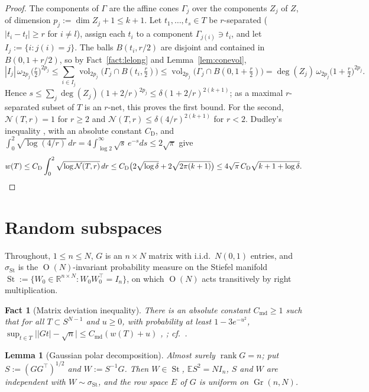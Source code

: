 \documentclass[11pt]{article}
\newtheorem{lemma}[theorem]{Lemma}
\newtheorem{fact}[theorem]{Fact}
\newcommand{\R}{\mathbb{R}}
\newcommand{\E}{\mathbb{E}}
\newcommand{\cN}{\mathcal{N}}
\DeclareMathOperator{\vol}{vol}
\DeclareMathOperator{\rank}{rank}
\DeclareMathOperator{\Gr}{Gr}
\DeclareMathOperator{\St}{St}
\DeclareMathOperator{\Ort}{O}
\newcommand{\Cmd}{C_{\mathrm{md}}}
\newcommand{\CD}{C_{\mathrm{D}}}
\begin{document}
\begin{proof}
The components of $\Gamma$ are the affine cones $\Gamma_j$ over the components $Z_j$ of $Z$, of dimension $p_j:=\dim Z_j+1\le k+1$. Let $t_1,\dots,t_s\in T$ be $r$-separated ($|t_i-t_l|\ge r$ for $i\ne l$), assign each $t_i$ to a component $\Gamma_{j(i)}\ni t_i$, and let $I_j:=\{i:j(i)=j\}$. The balls $B(t_i,r/2)$ are disjoint and contained in $B(0,1+r/2)$, so by Fact~\ref{fact:lelong} and Lemma~\ref{lem:conevol},
\[
|I_j|\,\omega_{2p_j}\big(\tfrac r2\big)^{2p_j}\le\sum_{i\in I_j}\vol_{2p_j}\big(\Gamma_j\cap B(t_i,\tfrac r2)\big)\le\vol_{2p_j}\big(\Gamma_j\cap B(0,1+\tfrac r2)\big)=\deg(Z_j)\,\omega_{2p_j}\big(1+\tfrac r2\big)^{2p_j}.
\]
Hence $s\le\sum_j\deg(Z_j)(1+2/r)^{2p_j}\le\delta(1+2/r)^{2(k+1)}$; as a maximal $r$-separated subset of $T$ is an $r$-net, this proves the first bound. For the second, $\cN(T,r)=1$ for $r\ge2$ and $\cN(T,r)\le\delta(4/r)^{2(k+1)}$ for $r<2$. Dudley's inequality \cite[Thm.~8.1.3]{Vershynin}, with an absolute constant $\CD$, and $\int_0^2\sqrt{\log(4/r)}\,dr=4\int_{\log2}^\infty\sqrt s\,e^{-s}ds\le2\sqrt\pi$ give
\[
w(T)\le\CD\int_0^2\sqrt{\log\cN(T,r)}\,dr\le\CD\big(2\sqrt{\log\delta}+2\sqrt{2\pi(k+1)}\big)\le4\sqrt\pi\,\CD\sqrt{k+1+\log\delta}.\qedhere
\]
\end{proof}

\section{Random subspaces}

Throughout, $1\le n\le N$, $G$ is an $n\times N$ matrix with i.i.d.\ $N(0,1)$ entries, and $\sigma_{\St}$ is the $\Ort(N)$-invariant probability measure on the Stiefel manifold $\St:=\{W_0\in\R^{n\times N}:W_0W_0^\top=I_n\}$, on which $\Ort(N)$ acts transitively by right multiplication.

\begin{fact}[Matrix deviation inequality]\label{fact:md}
There is an absolute constant $\Cmd\ge1$ such that for all $T\subset S^{N-1}$ and $u\ge0$, with probability at least $1-3e^{-u^2}$, $\sup_{t\in T}\big||Gt|-\sqrt n\big|\le\Cmd(w(T)+u)$ \cite[Thm.~1.4]{LMPV}, \cite[Exercise~9.1.8]{Vershynin}; cf.\ \cite{Gordon}.
\end{fact}

\begin{lemma}[Gaussian polar decomposition]\label{lem:polar}
Almost surely $\rank G=n$; put $S:=(GG^\top)^{1/2}$ and $W:=S^{-1}G$. Then $W\in\St$, $\E S^2=NI_n$, $S$ and $W$ are independent with $W\sim\sigma_{\St}$, and the row space $E$ of $G$ is uniform on $\Gr(n,N)$.
\end{lemma}
\end{document}
